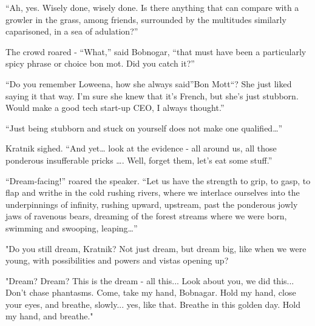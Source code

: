 ``Ah, yes. Wisely done, wisely done. Is there anything that can compare
with a growler in the grass, among friends, surrounded by the multitudes
similarly caparisoned, in a sea of adulation?''

The crowd roared - ``What,'' said Bobnogar, ``that must have been a
particularly spicy phrase or choice bon mot. Did you catch it?''

``Do you remember Loweena, how she always said''Bon Mott``? She just
liked saying it that way. I'm sure she knew that it's French, but she's
just stubborn. Would make a good tech start-up CEO, I always thought.''

``Just being stubborn and stuck on yourself does not make one
qualified\ldots{}''

Kratnik sighed. ``And yet\ldots{} look at the evidence - all around us,
all those ponderous insufferable pricks \ldots{}. Well, forget them,
let's eat some stuff.''

``Dream-facing!'' roared the speaker. ``Let us have the strength to
grip, to gasp, to flap and writhe in the cold rushing rivers, where we
interlace ourselves into the underpinnings of infinity, rushing upward,
upstream, past the ponderous jowly jaws of ravenous bears, dreaming of
the forest streams where we were born, swimming and swooping,
leaping\ldots{}''

"Do you still dream, Kratnik? Not just dream, but dream big, like when
we were young, with possibilities and powers and vistas opening up?

"Dream? Dream? This is the dream - all this... Look about you, we did
this... Don't chase phantasms. Come, take my hand, Bobnagar. Hold my
hand, close your eyes, and breathe, slowly... yes, like that. Breathe in
this golden day. Hold my hand, and breathe."
